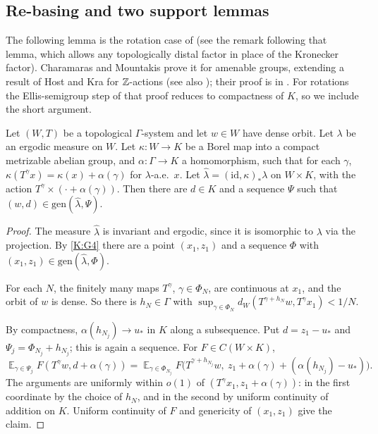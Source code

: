 \subsection{Re-basing and two support lemmas}\label{K:ssec:support}

The following lemma is the rotation case of \cite[Lemma~3.5]{charamaras2024finding} (see
the remark following that lemma, which allows any topologically distal factor in place of
the Kronecker factor). Charamaras and Mountakis prove it for amenable groups, extending a
result of Host and Kra for $\mathbb{Z}$-actions \cite[Proposition~6.1]{host2009uniformity} (see also
\cite[Proposition~3.19]{kra2022infinite}); their proof is in
\cite[Appendix~A]{charamaras2024finding}.
For rotations the Ellis-semigroup step of that proof reduces to compactness of $K$, so we
include the short argument.

\begin{lemma}[Re-basing]\label{K:lem:rebase}
Let $(W,T)$ be a topological $\Gamma$-system and let $w\in W$ have dense orbit.
Let $\lambda$ be an ergodic measure on $W$.
Let $\kappa\colon W\to K$ be a Borel map into a compact metrizable abelian group, and
$\alpha\colon\Gamma\to K$ a homomorphism, such that for each $\gamma$,
$\kappa(T^\gamma x)=\kappa(x)+\alpha(\gamma)$ for $\lambda$-a.e.\ $x$.
Let $\hat\lambda=(\mathrm{id},\kappa)_*\lambda$ on $W\times K$, with the action
$T^\gamma\times(\cdot+\alpha(\gamma))$.
Then there are $d\in K$ and a \Fol{} sequence $\Psi$ such that $(w,d)\in\mathrm{gen}(\hat\lambda,\Psi)$.
\end{lemma}

\begin{proof}
The measure $\hat\lambda$ is invariant and ergodic, since it is isomorphic to $\lambda$ via the
projection.
By \ref{K:G4} there are a point $(x_1,z_1)$ and a \Fol{} sequence $\Phi$ with
$(x_1,z_1)\in\mathrm{gen}(\hat\lambda,\Phi)$.

For each $N$, the finitely many maps $T^\gamma$, $\gamma\in\Phi_N$, are continuous at $x_1$,
and the orbit of $w$ is dense. So there is $h_N\in\Gamma$ with
$\sup_{\gamma\in\Phi_N}d_W(T^{\gamma+h_N}w,T^\gamma x_1)<1/N$.

By compactness, $\alpha(h_{N_j})\to u_*$ in $K$ along a subsequence. Put $d=z_1-u_*$ and
$\Psi_j=\Phi_{N_j}+h_{N_j}$; this is again a \Fol{} sequence.
For $F\in C(W\times K)$,
\[
\mathop{\mathbb E}_{\gamma\in\Psi_j}F(T^\gamma w,d+\alpha(\gamma))
=\mathop{\mathbb E}_{\gamma\in\Phi_{N_j}}F\big(T^{\gamma+h_{N_j}}w,\ z_1+\alpha(\gamma)+(\alpha(h_{N_j})-u_*)\big).
\]
The arguments are uniformly within $o(1)$ of $(T^\gamma x_1,z_1+\alpha(\gamma))$: in the first
coordinate by the choice of $h_N$, and in the second by uniform continuity of addition on
$K$. Uniform continuity of $F$ and genericity of $(x_1,z_1)$ give the claim.
\end{proof}

